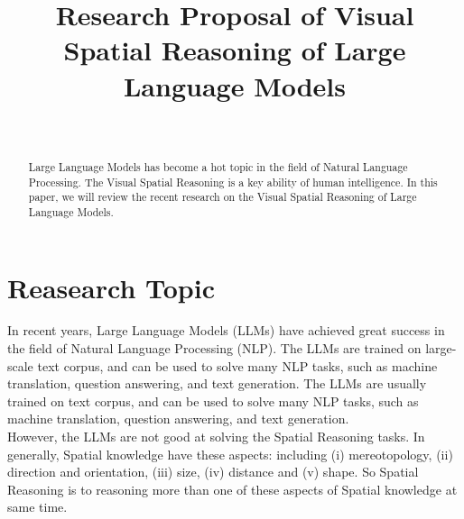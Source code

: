 \documentclass[journal,10pt]{IEEEtran}
\author{
    \IEEEauthorblockN{Jinlong Liu}\\
    \IEEEauthorblockA{Department of Computer Science, University of Liverpool
    \\J.Liu157@liverpool.ac.uk}
}
\title{Research Proposal of Visual Spatial Reasoning of Large Language Models}
\begin{document}
\maketitle
\begin{abstract}
Large Language Models has become a hot topic in the field of Natural Language Processing. The Visual Spatial Reasoning is a key ability of human intelligence. In this paper, we will review the recent research on the Visual Spatial Reasoning of Large Language Models.
\end{abstract}
\section{Reasearch Topic}
In recent years, Large Language Models (LLMs) have achieved great success in the field of Natural Language Processing (NLP). The LLMs are trained on large-scale text corpus, and can be used to solve many NLP tasks, such as machine translation, question answering, and text generation. The LLMs are usually trained on text corpus, and can be used to solve many NLP tasks, such as machine translation, question answering, and text generation. \\
However, the LLMs are not good at solving the Spatial Reasoning tasks. In generally, Spatial knowledge have these aspects: including (i) mereotopology, (ii) direction and orientation, (iii) size, (iv) distance and (v) shape\cite{cohn2008qualitative}. So Spatial Reasoning is to reasoning more than one of these aspects of Spatial knowledge at same time.



\end{document}

